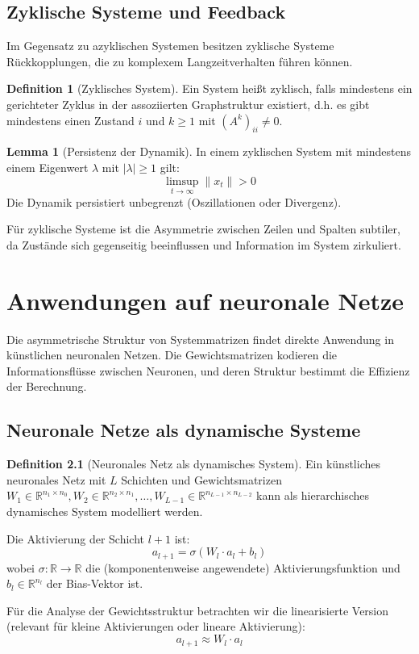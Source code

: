 \documentclass[a4paper,12pt]{report}
\theoremstyle{definition}
\newtheorem{definition}{Definition}
\newtheorem{lemma}{Lemma}
\begin{document}
	\section{Zyklische Systeme und Feedback}
	
	Im Gegensatz zu azyklischen Systemen besitzen zyklische Systeme Rückkopplungen, die zu komplexem Langzeitverhalten führen können.
	
	\begin{definition}[Zyklisches System]
		Ein System heißt zyklisch, falls mindestens ein gerichteter Zyklus in der assoziierten Graphstruktur existiert, d.h. es gibt mindestens einen Zustand $i$ und $k \geq 1$ mit $(A^k)_{ii} \neq 0$.
	\end{definition}
	
	\begin{lemma}[Persistenz der Dynamik]
		In einem zyklischen System mit mindestens einem Eigenwert $\lambda$ mit $|\lambda| \geq 1$ gilt:
		\[
		\limsup_{t \to \infty} \|x_t\| > 0
		\]
		Die Dynamik persistiert unbegrenzt (Oszillationen oder Divergenz).
	\end{lemma}
	
	Für zyklische Systeme ist die Asymmetrie zwischen Zeilen und Spalten subtiler, da Zustände sich gegenseitig beeinflussen und Information im System zirkuliert.
	
	\chapter{Anwendungen auf neuronale Netze}
	
	Die asymmetrische Struktur von Systemmatrizen findet direkte Anwendung in künstlichen neuronalen Netzen. Die Gewichtsmatrizen kodieren die Informationsflüsse zwischen Neuronen, und deren Struktur bestimmt die Effizienz der Berechnung.
	
	\section{Neuronale Netze als dynamische Systeme}
	
	\begin{definition}[Neuronales Netz als dynamisches System]
		Ein künstliches neuronales Netz mit $L$ Schichten und Gewichtsmatrizen $W_1 \in \mathbb{R}^{n_1 \times n_0}, W_2 \in \mathbb{R}^{n_2 \times n_1}, \ldots, W_{L-1} \in \mathbb{R}^{n_{L-1} \times n_{L-2}}$ kann als hierarchisches dynamisches System modelliert werden.
		
		Die Aktivierung der Schicht $l+1$ ist:
		\[
		a_{l+1} = \sigma(W_l \cdot a_l + b_l)
		\]
		wobei $\sigma : \mathbb{R} \to \mathbb{R}$ die (komponentenweise angewendete) Aktivierungsfunktion und $b_l \in \mathbb{R}^{n_l}$ der Bias-Vektor ist.
		
		Für die Analyse der Gewichtsstruktur betrachten wir die linearisierte Version (relevant für kleine Aktivierungen oder lineare Aktivierung):
		\[
		a_{l+1} \approx W_l \cdot a_l
		\]
	\end{definition}
	
\end{document}
